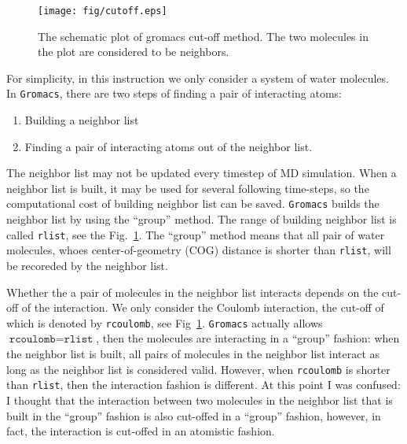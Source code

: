 \documentclass[aps,pre,preprint]{revtex4-1}
\newcommand{\gromacs}[0]{\texttt{Gromacs}}
\newcommand{\rlist}[0]{\texttt{rlist}}
\newcommand{\rcoulomb}[0]{\texttt{rcoulomb}}
\begin{document}
\begin{figure}
  \centering
  \texttt{[image: fig/cutoff.eps]}
  \caption{The schematic plot of gromacs cut-off method. The two molecules
  in the plot are considered to be neighbors.}
  \label{fig:tmp1}
\end{figure}

For simplicity, in this instruction we only consider a system of water
molecules. In \gromacs, there are two steps of finding a pair of interacting atoms:
\begin{enumerate}
\item Building a neighbor list
\item Finding a pair of interacting atoms out of the neighbor list.
\end{enumerate}
The neighbor list may not be updated every timestep of MD
simulation. When a neighbor list is built, it may be used for several
following time-steps, so the computational cost of building neighbor
list can be saved.  \gromacs{} builds the neighbor list by using the
``group'' method.  The range of building
neighbor list is called \rlist{}, see the Fig.~\ref{fig:tmp1}.
The ``group'' method means that all pair of water
molecules, whoes center-of-geometry (COG) distance is shorter than
\rlist, will be recoreded by the neighbor list.

Whether the a pair of molecules in the neighbor list interacts
depends on the cut-off of the interaction. We only consider the
Coulomb interaction, the cut-off of which is denoted by \rcoulomb, see
Fig~\ref{fig:tmp1}. \gromacs{} actually allows $\rcoulomb = \rlist$,
then the molecules are interacting in a ``group'' fashion:
when the neighbor list is built, all pairs of molecules in the neighbor list
interact as long as the neighbor list is considered valid.
However, when \rcoulomb{} is shorter than \rlist{}, then the interaction
fashion is different.
At this point I was confused: I thought that the interaction between two
molecules in the neighbor list that is built in the ``group'' fashion is also
cut-offed in a ``group'' fashion, however, in fact, the interaction is 
cut-offed in an atomistic fashion. 
\end{document}

